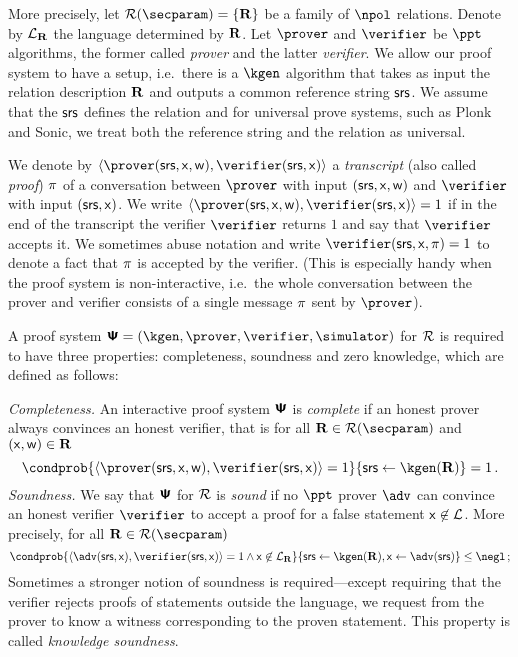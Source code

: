 \documentclass[runningheads,11pt]{llncs}
\newcommand{\ourpar}[1] {\smallskip\noindent\emph{#1}}
\begin{document}
More precisely, let $\RELGEN(\secparam) = \smallset{\REL}$ be a family of
$\npol$ relations. Denote by $\mathcal{L}_{\mathbf{R}}$ the language determined by $\mathbf{R}$.
Let $\prover$ and $\verifier$ be $\ppt$ algorithms, the former called
\emph{prover} and the latter \emph{verifier}. We allow our proof system to have
a setup, i.e.~there is a $\kgen$ algorithm that takes as input the relation
description $\mathbf{R}$ and outputs a common reference string $\mathsf{srs}$. We assume that
the $\mathsf{srs}$ defines the relation and for universal prove systems, such as Plonk
and Sonic, we treat both the reference string and the relation as universal.

We denote by $\ip{\prover(\srs, \inp, \wit)}{\verifier(\srs,\inp)}$ a
\emph{transcript} (also called \emph{proof}) $\pi$ of a conversation
between $\prover$ with input $(\mathsf{srs}, \mathsf{x}, \mathsf{w})$ and $\verifier$ with input
$(\mathsf{srs}, \mathsf{x})$. We write
$\ip{\prover (\srs, \inp, \wit)}{\verifier(\srs, \inp)} = 1$ if in the end of
the transcript the verifier $\verifier$ returns $1$ and say that $\verifier$
accepts it. We sometimes abuse notation and write
$\verifier(\srs, \inp, \zkproof) = 1$ to denote a fact that $\pi$ is
accepted by the verifier. (This is especially handy when the proof system is
non-interactive, i.e.~the whole conversation between the prover and verifier
consists of a single message $\pi$ sent by $\prover$).

A proof system $\proofsystem = (\kgen, \prover, \verifier, \simulator)$ for
$\mathcal{R}$ is required to have three properties: completeness, soundness and zero
knowledge, which are defined as follows:

\ourpar{Completeness.}
  An interactive proof system $\bm{\mathsf{\Psi}}$ is
  \emph{complete} if an honest prover always convinces an honest verifier, that
  is for all $\REL \in \RELGEN(\secparam)$ and $(\mathsf{x}, \mathsf{w}) \in \mathbf{R}$
	\[
		\condprob{\ip{\prover (\srs, \inp, \wit)}{\verifier (\srs,
        \inp)} = 1}{\srs \gets \kgen(\REL)} = 1\,.
	\]
\ourpar{Soundness.}
    We say that $\bm{\mathsf{\Psi}}$ for $\mathcal{R}$ is \emph{sound} if no
  $\ppt$ prover $\adv$ can convince an honest verifier $\verifier$ to accept a
  proof for a false statement $\mathsf{x} \not\in\mathcal{L}$. More precisely, for
  all $\REL \in \RELGEN(\secparam)$
	\[
    \condprob{\ip{\adv(\srs, \inp)}{\verifier(\srs, \inp)} = 1 \land \inp
      \not\in \LANG_\REL}{\srs \gets \kgen(\REL), \inp \gets \adv(\srs)} \leq
    \negl\,;
	\]
Sometimes a stronger notion of soundness is required---except requiring that the
verifier rejects proofs of statements outside the language, we request from the
prover to know a witness corresponding to the proven statement. This property is
called \emph{knowledge soundness}.%
\end{document}
